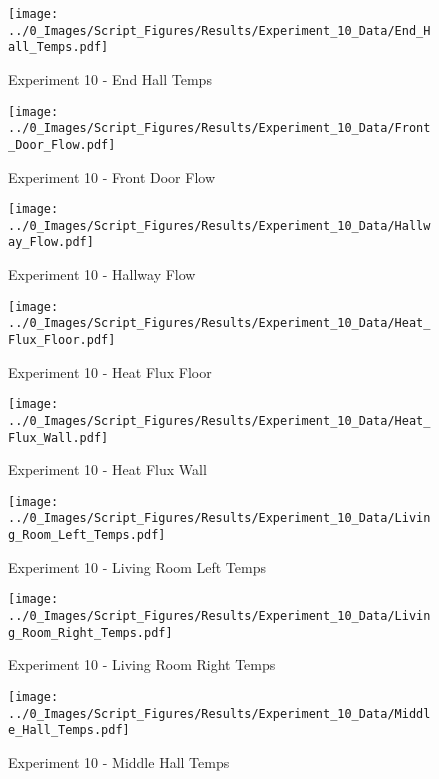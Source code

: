 	\begin{figure}[H]
		\centering
		\texttt{[image: ../0\_Images/Script\_Figures/Results/Experiment\_10\_Data/End\_Hall\_Temps.pdf]}
		\caption[]{Experiment 10 - End Hall Temps}
	\end{figure}
 
	\clearpage

	\begin{figure}[H]
		\centering
		\texttt{[image: ../0\_Images/Script\_Figures/Results/Experiment\_10\_Data/Front\_Door\_Flow.pdf]}
		\caption[]{Experiment 10 - Front Door Flow}
	\end{figure}
 

	\begin{figure}[H]
		\centering
		\texttt{[image: ../0\_Images/Script\_Figures/Results/Experiment\_10\_Data/Hallway\_Flow.pdf]}
		\caption[]{Experiment 10 - Hallway Flow}
	\end{figure}
 
	\clearpage

	\begin{figure}[H]
		\centering
		\texttt{[image: ../0\_Images/Script\_Figures/Results/Experiment\_10\_Data/Heat\_Flux\_Floor.pdf]}
		\caption[]{Experiment 10 - Heat Flux Floor}
	\end{figure}
 

	\begin{figure}[H]
		\centering
		\texttt{[image: ../0\_Images/Script\_Figures/Results/Experiment\_10\_Data/Heat\_Flux\_Wall.pdf]}
		\caption[]{Experiment 10 - Heat Flux Wall}
	\end{figure}
 
	\clearpage

	\begin{figure}[H]
		\centering
		\texttt{[image: ../0\_Images/Script\_Figures/Results/Experiment\_10\_Data/Living\_Room\_Left\_Temps.pdf]}
		\caption[]{Experiment 10 - Living Room Left Temps}
	\end{figure}
 

	\begin{figure}[H]
		\centering
		\texttt{[image: ../0\_Images/Script\_Figures/Results/Experiment\_10\_Data/Living\_Room\_Right\_Temps.pdf]}
		\caption[]{Experiment 10 - Living Room Right Temps}
	\end{figure}
 
	\clearpage

	\begin{figure}[H]
		\centering
		\texttt{[image: ../0\_Images/Script\_Figures/Results/Experiment\_10\_Data/Middle\_Hall\_Temps.pdf]}
		\caption[]{Experiment 10 - Middle Hall Temps}
	\end{figure}
 


